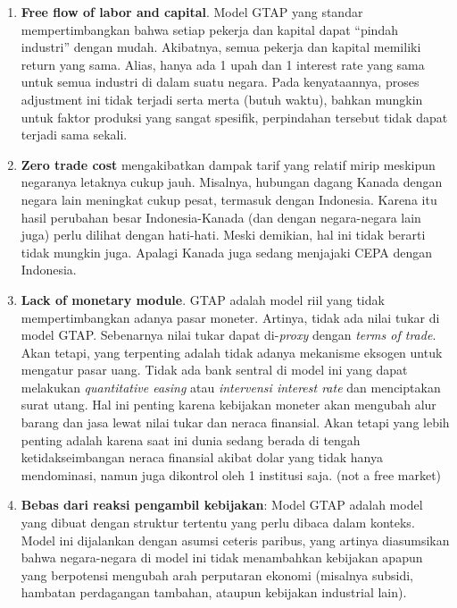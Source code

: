 \documentclass[
]{interact}
\begin{document}
\begin{enumerate}
\def\labelenumi{\arabic{enumi}.}
\item
  \textbf{Free flow of labor and capital}. Model GTAP yang standar
  mempertimbangkan bahwa setiap pekerja dan kapital dapat ``pindah
  industri'' dengan mudah. Akibatnya, semua pekerja dan kapital memiliki
  return yang sama. Alias, hanya ada 1 upah dan 1 interest rate yang
  sama untuk semua industri di dalam suatu negara. Pada kenyataannya,
  proses adjustment ini tidak terjadi serta merta (butuh waktu), bahkan
  mungkin untuk faktor produksi yang sangat spesifik, perpindahan
  tersebut tidak dapat terjadi sama sekali.
\item
  \textbf{Zero trade cost} mengakibatkan dampak tarif yang relatif mirip
  meskipun negaranya letaknya cukup jauh. Misalnya, hubungan dagang
  Kanada dengan negara lain meningkat cukup pesat, termasuk dengan
  Indonesia. Karena itu hasil perubahan besar Indonesia-Kanada (dan
  dengan negara-negara lain juga) perlu dilihat dengan hati-hati. Meski
  demikian, hal ini tidak berarti tidak mungkin juga. Apalagi Kanada
  juga sedang menjajaki CEPA dengan Indonesia.
\item
  \textbf{Lack of monetary module}. GTAP adalah model riil yang tidak
  mempertimbangkan adanya pasar moneter. Artinya, tidak ada nilai tukar
  di model GTAP. Sebenarnya nilai tukar dapat di-\emph{proxy} dengan
  \emph{terms of trade}. Akan tetapi, yang terpenting adalah tidak
  adanya mekanisme eksogen untuk mengatur pasar uang. Tidak ada bank
  sentral di model ini yang dapat melakukan \emph{quantitative easing}
  atau \emph{intervensi interest rate} dan menciptakan surat utang. Hal
  ini penting karena kebijakan moneter akan mengubah alur barang dan
  jasa lewat nilai tukar dan neraca finansial. Akan tetapi yang lebih
  penting adalah karena saat ini dunia sedang berada di tengah
  ketidakseimbangan neraca finansial akibat dolar yang tidak hanya
  mendominasi, namun juga dikontrol oleh 1 institusi saja. (not a free
  market)
\item
  \textbf{Bebas dari reaksi pengambil kebijakan}: Model GTAP adalah
  model yang dibuat dengan struktur tertentu yang perlu dibaca dalam
  konteks. Model ini dijalankan dengan asumsi ceteris paribus, yang
  artinya diasumsikan bahwa negara-negara di model ini tidak menambahkan
  kebijakan apapun yang berpotensi mengubah arah perputaran ekonomi
  (misalnya subsidi, hambatan perdagangan tambahan, ataupun kebijakan
  industrial lain).
\end{enumerate}
\end{document}
